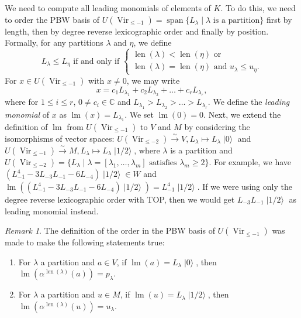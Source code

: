 \documentclass[a4paper, 12pt, reqno]{amsart}
\theoremstyle{remark}
\newtheorem{remark}[theorem]{Remark}
\DeclareMathOperator{\Vir}{Vir}
\DeclareMathOperator{\lm}{lm}
\DeclareMathOperator{\vspan}{span}
\DeclareMathOperator{\len}{len}
\DeclareMathOperator{\vac}{|0\rangle}
\DeclareMathOperator{\vachalf}{|1/2\rangle}
\begin{document}
We need to compute all leading monomials of elements of $K$.
To do this, we need to order the PBW basis of $U(\Vir_{\le -1}) = \vspan\{L_{\lambda} \mid \text{$\lambda$ is a partition}\}$ first by length, then by degree reverse lexicographic order and finally by position.
Formally, for any partitions $\lambda$ and $\eta$, we define
\begin{equation*}
  L_{\lambda} \le L_{\eta}\text{ if and only if }
  \begin{cases}
    \len(\lambda) < \len(\eta)\text{ or } \\
    \len(\lambda) = \len(\eta)\text{ and }u_{\lambda} \le u_{\eta}.
  \end{cases}
\end{equation*}
For $x \in U(\Vir_{\le -1})$ with $x \neq 0$, we may write
\begin{equation*}
  x = c_1L_{\lambda_1} + c_2L_{\lambda_2} + \dots + c_rL_{\lambda_r},
\end{equation*}
where for $1 \le i \le r$, $0 \neq c_i \in \mathbb{C}$ and $L_{\lambda_1} > L_{\lambda_2} > \dots > L_{\lambda_r}$.
We define the \emph{leading monomial} of $x$ as $\lm(x) = L_{\lambda_1}$.
We set $\lm(0) = 0$.
Next, we extend the definition of $\lm$ from $U(\Vir_{\le -1})$ to $V$ and $M$ by considering the isomorphisms of vector spaces: $U(\Vir_{\le -2}) \xrightarrow{\sim} V, L_{\lambda} \mapsto L_{\lambda}\vac$ and $U(\Vir_{\le -1}) \xrightarrow{\sim} M, L_{\lambda} \mapsto L_{\lambda}\vachalf$, where $\lambda$ is a partition and $U(\Vir_{\le -2}) = \{L_{\lambda} \mid \text{$\lambda = [\lambda_1, \dots, \lambda_m]$ satisfies $\lambda_m \ge 2$}\}$.
For example, we have $(L_{-1}^4 - 3L_{-3}L_{-1} - 6L_{-4})\vachalf \in W$ and $\lm((L_{-1}^4 - 3L_{-3}L_{-1} - 6L_{-4})\vachalf) = L_{-1}^4\vachalf$.
If we were using only the degree reverse lexicographic order with TOP, then we would get $L_{-3}L_{-1}\vachalf$ as leading monomial instead.

\begin{remark}
  \label{rmk:3}
  The definition of the order in the PBW basis of $U(\Vir_{\le -1})$ was made to make the following statements true:
  \begin{enumerate}
  \item For $\lambda$ a partition and $a \in V$, if $\lm(a) = L_{\lambda}\vac$, then $\lm(\alpha^{\len(\lambda)}(a)) = p_{\lambda}$.
  \item For $\lambda$ a partition and $u \in M$, if $\lm(u) = L_{\lambda}\vachalf$, then $\lm(\alpha^{\len(\lambda)}(u)) = u_{\lambda}$.
  \end{enumerate}
\end{remark}
\end{document}
